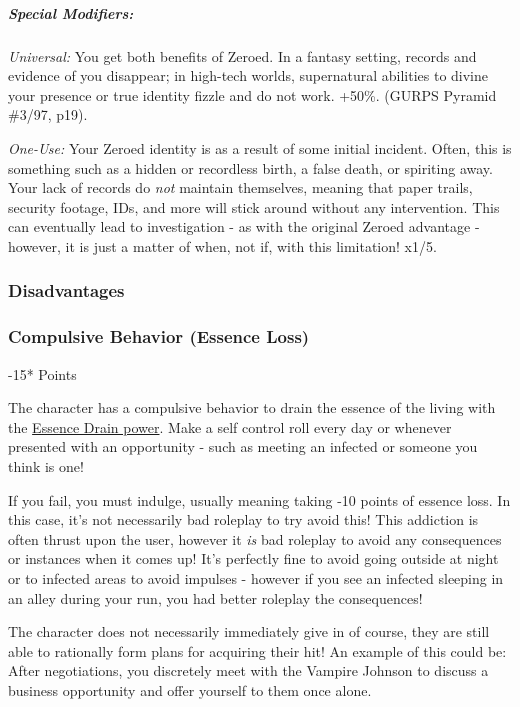\begin{multicols}{3}
	\subparagraph{Special Modifiers:\\}
	
	\textit{Universal:} You get both benefits of Zeroed. In a fantasy setting, records and evidence of you disappear; in high-tech worlds, supernatural abilities to divine your presence or true identity fizzle and do not work. +50\%. (GURPS Pyramid \#3/97, p19). 
	
	\textit{One-Use:} Your Zeroed identity is as a result of some initial incident. Often, this is something such as a hidden or recordless birth, a false death, or spiriting away. Your lack of records do \textit{not} maintain themselves, meaning that paper trails, security footage, IDs, and more will stick around without any intervention. This can eventually lead to investigation - as with the original Zeroed advantage - however, it is just a matter of when, not if, with this limitation! x1/5.
	
	\subsubsection{Disadvantages}
	
	\subsubsection*{Compulsive Behavior (Essence Loss)}
	\begin{flushright}
		-15* Points
	\end{flushright}
	
	The character has a compulsive behavior to drain the essence of the living with the \hyperref[essence_drain]{Essence Drain power}. Make a self control roll every day or whenever presented with an opportunity - such as meeting an infected or someone you think is one!
	
	If you fail, you must indulge, usually meaning taking -10 points of essence loss. In this case, it's not necessarily bad roleplay to try avoid this! This addiction is often thrust upon the user, however it \textit{is} bad roleplay to avoid any consequences or instances when it comes up! It's perfectly fine to avoid going outside at night or to infected areas to avoid impulses - however if you see an infected sleeping in an alley during your run, you had better roleplay the consequences!
	
	The character does not necessarily immediately give in of course, they are still able to rationally form plans for acquiring their hit! An example of this could be: After negotiations, you discretely meet with the Vampire Johnson to discuss a business opportunity and offer yourself to them once alone.
	

\end{multicols}
